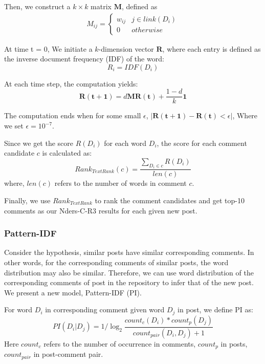 \documentclass{sig-alternate}
\begin{document}
Then, we construct a $k \times k$ matrix $\bm{M}$, defined as
\begin{equation}
  \begin{aligned}
    M_{ij} = \begin{cases} 
             w_{ij} & j \in link(D_i) \\
             0 & otherwise
             \end{cases}
  \end{aligned}
\end{equation}

At time t = 0, We initiate a $k$-dimension vector $\bm{R}$, where each entry is defined as the inverse document frequency (IDF) of the word: 
\begin{equation}
  R_i = IDF(D_i)
\end{equation}

At each time step, the computation yields:
\begin{equation}
  \bm{R(t+1)} = d\bm{M}\bm{R(t)} + \frac{1-d}{k} \bm{1}
\end{equation}

The computation ends when for some small $\epsilon$, $|\bm{R(t+1)} - \bm{R(t)} < \epsilon|$, Where we set $\epsilon = 10^{-7}$.

Since we get the score $R(D_i)$ for each word $D_i$, the score for each comment candidate $c$ is calculated as:
\begin{equation}
  Rank_{TextRank}(c) = \frac{\sum_{D_i \in c}{R(D_i)}}{len(c)} 
\end{equation}
where, $len(c)$ refers to the number of words in comment $c$.

Finally, we use $Rank_{TextRank}$ to rank the comment candidates and get top-10 comments as our Nders-C-R3 results for each given new post.

\subsubsection{Pattern-IDF}
Consider the hypothesis, similar posts have similar corresponding comments. In 
other words, for the corresponding comments of similar posts, the word 
distribution may also be similar. Therefore, we can use word distribution of 
the corresponding comments of post in the repository to infer that of the new post. We present a new model, Pattern-IDF (PI).

For word $D_i$ in corresponding comment given word $D_j$ in post, we define PI as:
\begin{equation}
  PI(D_i|D_j) = 1 / \log_{2}{\frac{count_c(D_i) * count_p(D_j)}{count_{pair}(D_i, D_j) + 1}}
\end{equation}
Here $count_c$ refers to the number of occurrence in comments, $count_p$ in posts, $count_{pair}$ in post-comment pair.
\end{document}
